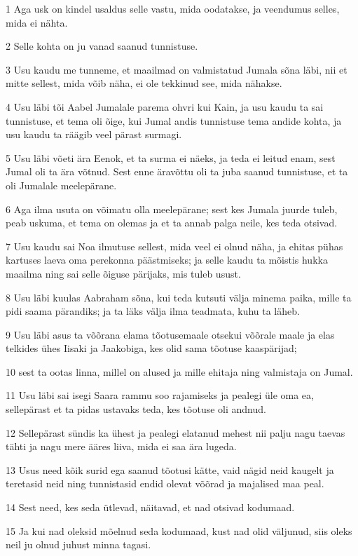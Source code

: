 \par 1 Aga usk on kindel usaldus selle vastu, mida oodatakse, ja veendumus selles, mida ei nähta.
\par 2 Selle kohta on ju vanad saanud tunnistuse.
\par 3 Usu kaudu me tunneme, et maailmad on valmistatud Jumala sõna läbi, nii et mitte sellest, mida võib näha, ei ole tekkinud see, mida nähakse.
\par 4 Usu läbi tõi Aabel Jumalale parema ohvri kui Kain, ja usu kaudu ta sai tunnistuse, et tema oli õige, kui Jumal andis tunnistuse tema andide kohta, ja usu kaudu ta räägib veel pärast surmagi.
\par 5 Usu läbi võeti ära Eenok, et ta surma ei näeks, ja teda ei leitud enam, sest Jumal oli ta ära võtnud. Sest enne äravõttu oli ta juba saanud tunnistuse, et ta oli Jumalale meelepärane.
\par 6 Aga ilma usuta on võimatu olla meelepärane; sest kes Jumala juurde tuleb, peab uskuma, et tema on olemas ja et ta annab palga neile, kes teda otsivad.
\par 7 Usu kaudu sai Noa ilmutuse sellest, mida veel ei olnud näha, ja ehitas pühas kartuses laeva oma perekonna päästmiseks; ja selle kaudu ta mõistis hukka maailma ning sai selle õiguse pärijaks, mis tuleb usust.
\par 8 Usu läbi kuulas Aabraham sõna, kui teda kutsuti välja minema paika, mille ta pidi saama pärandiks; ja ta läks välja ilma teadmata, kuhu ta läheb.
\par 9 Usu läbi asus ta võõrana elama tõotusemaale otsekui võõrale maale ja elas telkides ühes Iisaki ja Jaakobiga, kes olid sama tõotuse kaaspärijad;
\par 10 sest ta ootas linna, millel on alused ja mille ehitaja ning valmistaja on Jumal.
\par 11 Usu läbi sai isegi Saara rammu soo rajamiseks ja pealegi üle oma ea, sellepärast et ta pidas ustavaks teda, kes tõotuse oli andnud.
\par 12 Sellepärast sündis ka ühest ja pealegi elatanud mehest nii palju nagu taevas tähti ja nagu mere ääres liiva, mida ei saa ära lugeda.
\par 13 Usus need kõik surid ega saanud tõotusi kätte, vaid nägid neid kaugelt ja teretasid neid ning tunnistasid endid olevat võõrad ja majalised maa peal.
\par 14 Sest need, kes seda ütlevad, näitavad, et nad otsivad kodumaad.
\par 15 Ja kui nad oleksid mõelnud seda kodumaad, kust nad olid väljunud, siis oleks neil ju olnud juhust minna tagasi.
